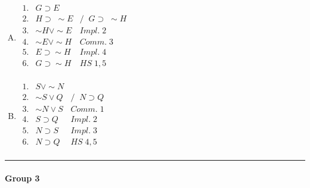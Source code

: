 \documentclass[10pt]{article}
\begin{document}
\begin{multicols}{2}
\begin{enumerate}[A.]
 \item $\begin{array}{lll}
         1. & G \supset E & \\
         2. & H \supset\; \sim\! E & /\;\; G \supset\; \sim\! H \\
         3. & \sim\! H \vee \sim\! E & Impl. \;2 \\
         4. & \sim\! E \vee \sim\! H & Comm. \;3 \\
         5. & E \supset \sim\! H & Impl. \;4 \\
         6. & G \supset \sim\! H & HS \;1,5 \\
        \end{array}$
        
 \vspace{1cm}
        
 \item $\begin{array}{lll}
         1. & S \vee \sim\! N & \\
         2. & \sim\! S \vee Q & /\;\; N \supset Q \\
         3. & \sim\! N \vee S & Comm. \;1 \\
         4. & S \supset Q & Impl. \;2 \\
         5. & N \supset S & Impl. \;3 \\
         6. & N \supset Q & HS \;4,5 \\
        \end{array}$
\end{enumerate}

\end{multicols}
\hrule
\vspace{5mm}

\paragraph{Group 3}
\end{document}
